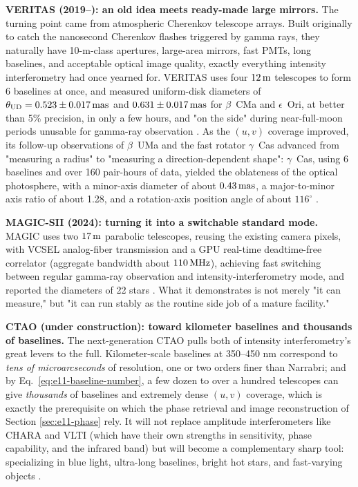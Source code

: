 \textbf{VERITAS (2019--): an old idea meets ready-made large mirrors.} The turning point came from atmospheric Cherenkov telescope arrays. Built originally to catch the nanosecond Cherenkov flashes triggered by gamma rays, they naturally have 10-m-class apertures, large-area mirrors, fast PMTs, long baselines, and acceptable optical image quality, exactly everything intensity interferometry had once yearned for. VERITAS uses four \(12\,{\rm m}\) telescopes to form 6 baselines at once, and measured uniform-disk diameters of \(\theta_{\rm UD}=0.523\pm0.017\,{\rm mas}\) and \(0.631\pm0.017\,{\rm mas}\) for \(\beta\)~CMa and \(\epsilon\)~Ori, at better than 5\% precision, in only a few hours, and "on the side" during near-full-moon periods unusable for gamma-ray observation \citep{2020NatAs...4.1164A}. As the \((u,v)\) coverage improved, its follow-up observations of \(\beta\)~UMa and the fast rotator \(\gamma\)~Cas advanced from "measuring a radius" to "measuring a direction-dependent shape": \(\gamma\)~Cas, using 6 baselines and over 160 pair-hours of data, yielded the oblateness of the optical photosphere, with a minor-axis diameter of about \(0.43\,{\rm mas}\), a major-to-minor axis ratio of about 1.28, and a rotation-axis position angle of about \(116^\circ\) \citep{2024ApJ...966...28A,2025ApJ...995..191A}.

\textbf{MAGIC-SII (2024): turning it into a switchable standard mode.} MAGIC uses two \(17\,{\rm m}\) parabolic telescopes, reusing the existing camera pixels, with VCSEL analog-fiber transmission and a GPU real-time deadtime-free correlator (aggregate bandwidth about \(110\,{\rm MHz}\)), achieving fast switching between regular gamma-ray observation and intensity-interferometry mode, and reported the diameters of 22 stars \citep{2024MNRAS.529.4387A}. What it demonstrates is not merely "it can measure," but "it can run stably as the routine side job of a mature facility."

\textbf{CTAO (under construction): toward kilometer baselines and thousands of baselines.} The next-generation CTAO pulls both of intensity interferometry's great levers to the full. Kilometer-scale baselines at 350--450 nm correspond to \emph{tens of microarcseconds} of resolution, one or two orders finer than Narrabri; and by Eq.~\eqref{eq:e11-baseline-number}, a few dozen to over a hundred telescopes can give \emph{thousands} of baselines and extremely dense \((u,v)\) coverage, which is exactly the prerequisite on which the phase retrieval and image reconstruction of Section \ref{sec:e11-phase} rely. It will not replace amplitude interferometers like CHARA and VLTI (which have their own strengths in sensitivity, phase capability, and the infrared band) but will become a complementary sharp tool: specializing in blue light, ultra-long baselines, bright hot stars, and fast-varying objects \citep{2013APh....43..331D,2014SPIE.9146E..0ZD}.

